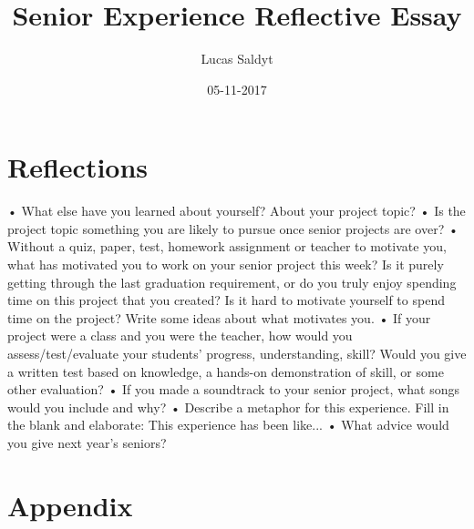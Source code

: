 \documentclass{article}
\title{Senior Experience Reflective Essay}
\date{05-11-2017}
\author{Lucas Saldyt}
\begin{document}
\maketitle
{}
\newpage
{}

\section{Reflections}

• What else have you learned about yourself? About your project topic?
• Is the project topic something you are likely to pursue once senior projects are over?
• Without a quiz, paper, test, homework assignment or teacher to motivate you, what has
motivated you to work on your senior project this week? Is it purely getting through the
last graduation requirement, or do you truly enjoy spending time on this project that you
created? Is it hard to motivate yourself to spend time on the project? Write some ideas
about what motivates you.
• If your project were a class and you were the teacher, how would you assess/test/evaluate
your students’ progress, understanding, skill? Would you give a written test based on
knowledge, a hands-on demonstration of skill, or some other evaluation?
• If you made a soundtrack to your senior project, what songs would you include and why?
• Describe a metaphor for this experience. Fill in the blank and elaborate: This experience
has been like...
• What advice would you give next year’s seniors?

\section{Appendix}
\end{document}
